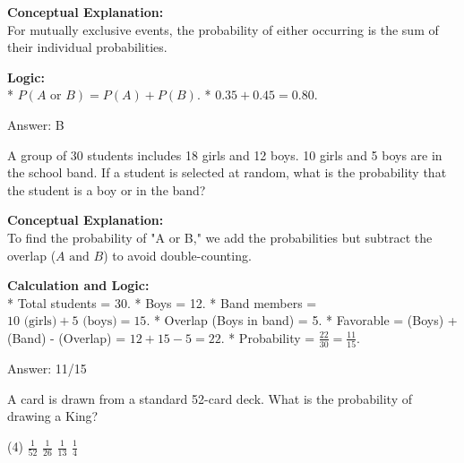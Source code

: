 \documentclass[11pt,paper=a4,answers]{exam}
\begin{document}
\begin{questions}
\begin{solution}
\textbf{Conceptual Explanation:} \\
For mutually exclusive events, the probability of either occurring is the sum of their individual probabilities.

\vspace{30pt}

\textbf{Logic:} \\
* $P(A \text{ or } B) = P(A) + P(B)$.
* $0.35 + 0.45 = 0.80$.

\vspace{30pt}

Answer: \colorbox{yellow!100}{B}
\end{solution}

\vspace{60pt}

\question
A group of 30 students includes 18 girls and 12 boys. 10 girls and 5 boys are in the school band. If a student is selected at random, what is the probability that the student is a boy or in the band?

\begin{solution}
\textbf{Conceptual Explanation:} \\
To find the probability of "A or B," we add the probabilities but subtract the overlap ($A \text{ and } B$) to avoid double-counting.

\vspace{30pt}

\textbf{Calculation and Logic:} \\
* Total students = 30.
* Boys = 12.
* Band members = $10 \text{ (girls)} + 5 \text{ (boys)} = 15$.
* Overlap (Boys in band) = 5.
* Favorable = (Boys) + (Band) - (Overlap) = $12 + 15 - 5 = 22$.
* Probability = $\frac{22}{30} = \frac{11}{15}$.

\vspace{30pt}

Answer: \colorbox{yellow!100}{11/15}
\end{solution}

\vspace{60pt}

\question
A card is drawn from a standard 52-card deck. What is the probability of drawing a King?
\begin{tasks}(4)
    \task $\frac{1}{52}$
    \task $\frac{1}{26}$
    \task $\frac{1}{13}$
    \task $\frac{1}{4}$
\end{tasks}


\end{questions}
\end{document}
